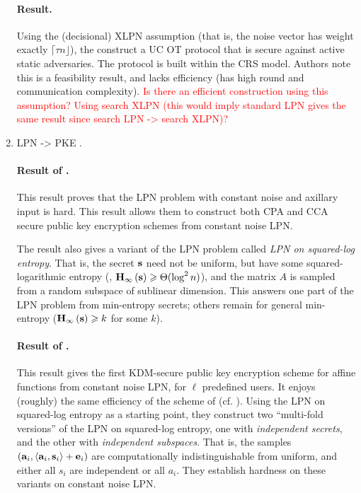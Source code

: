 \begin{enumerate}
	\paragraph{Result.} 
	Using the (decisional) XLPN assumption (that is, the noise vector has weight exactly $\lceil \tau n\rfloor$), the construct a UC OT protocol that is secure against active static adversaries.
	The protocol is built within the CRS model.
	Authors note this is a feasibility result, and lacks efficiency (has high round and communication complexity).
	\textcolor{red}{Is there an efficient construction using this assumption?
	Using search XLPN (this would imply standard LPN gives the same result since search LPN -> search XLPN)?}
	
	\item LPN -> PKE \cite{C:YuZha16,HanLiu17}.
	\paragraph{Result of \cite{C:YuZha16}.}
	This result proves that the LPN problem with constant noise and axillary input is hard.
	This result allows them to construct both CPA and CCA secure public key encryption schemes from constant noise LPN.
	
	The result also gives a variant of the LPN problem called \textit{LPN on squared-log entropy}.
	That is, the secret ${\mathbf s}$ need not be uniform, but have some squared-logarithmic entropy (\ie, $\minentropy[\bs] \geq \Theta(\log^2 n)$), and the matrix $A$ is sampled from a random subspace of sublinear dimension.
	This answers one part of the LPN problem from min-entropy secrets; others remain for general min-entropy (\ie $\minentropy[\bs]\geq k$ for some $k$).
	
	\paragraph{Result of \cite{HanLiu17}.}
	This result gives the first KDM-secure public key encryption scheme for affine functions from constant noise LPN, for $\ell$ predefined users.
	It enjoys (roughly) the same efficiency of the scheme of \cite{C:YuZha16} (cf. \cite[Table 1]{HanLiu17}).
	Using the LPN on squared-log entropy as a starting point, they construct two ``multi-fold versions'' of the LPN on squared-log entropy, one with \textit{independent secrets}, and the other with \textit{independent subspaces}.
	That is, the samples $(\ba_i, \ip{\ba_i}{\bs_i}+\be_i)$ are computationally indistinguishable from uniform, and either all $s_i$ are independent or all $a_i$.
	They establish hardness on these variants on constant noise LPN.
	

\end{enumerate}
